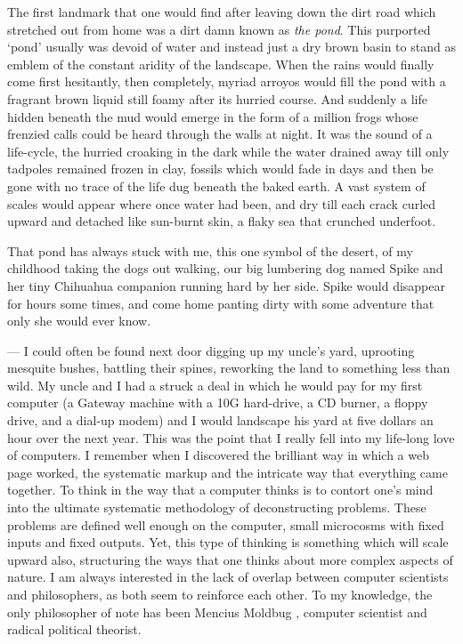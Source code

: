 \documentclass[ebook, 10pt, openright, onecolumn]{memoir}
\newcommand\td[1]{
  \todo[inline]{
     #1 
  }
}
\newcommand\finish{\td{ ----- Finish this section -----}}
\begin{document}
The first landmark that one would find after leaving down the dirt road which
stretched out from home was a dirt damn known as \textit{the pond}.  This
purported `pond' usually was devoid of water and instead just a dry brown basin
to stand as emblem of the constant aridity of the landscape.  When the rains
would finally come first hesitantly, then completely, myriad arroyos would fill
the pond with a fragrant brown liquid still foamy after its hurried course.  And
suddenly a life hidden beneath the mud would emerge in the form of a million
frogs whose frenzied calls could be heard through the walls at night.  It was
the sound of a life-cycle, the hurried croaking in the dark while the water
drained away till only tadpoles remained frozen in clay, fossils which would
fade in days and then be gone with no trace of the life dug beneath the baked
earth.  A vast system of scales would appear where once water had been, and dry
till each crack curled upward and detached like sun-burnt skin, a flaky sea
that crunched underfoot.

That pond has always stuck with me, this one symbol of the desert, of my
childhood taking the dogs out walking, our big lumbering dog named Spike and her
tiny Chihuahua companion running hard by her side.  Spike would disappear for
hours some times, and come home panting dirty with some adventure that only she
would ever know. 

\finish

--- I could often be found next door digging up my uncle's yard, uprooting
mesquite bushes, battling their spines, reworking the land to something less
than wild.  My uncle and I had a struck a deal in which he would pay for my
first computer (a Gateway machine with a 10G hard-drive, a CD burner, a floppy
drive, and a dial-up modem) and I would landscape his yard at five dollars an
hour over the next year.  This was the point that I really fell into my
life-long love of computers.  I remember when I discovered the brilliant way in
which a web page worked, the systematic markup and the intricate way that
everything came together.  To think in the way that a computer thinks is to
contort one's mind into the ultimate systematic methodology of deconstructing
problems.  These problems are defined well enough on the computer, small
microcosms with fixed inputs and fixed outputs.  Yet, this type of thinking is
something which will scale upward also, structuring the ways that one thinks
about more complex aspects of nature.  I am always interested in the lack of
overlap between computer scientists and philosophers, as both seem to reinforce
each other. To my knowledge, the only philosopher of note has been Mencius
Moldbug , computer scientist and radical political
theorist.
\finish
\end{document}
